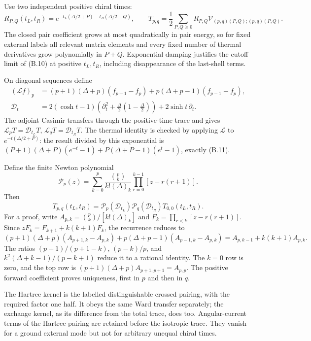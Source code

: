 Use two independent positive chiral times: \[
R_{P,Q}(t_L,t_R)=e^{-t_L(\Delta/2+P)-t_R(\Delta/2+Q)},\qquad
T_{p,q}=\frac12\sum_{P,Q\ge0}R_{P,Q}
\mathcal V_{(p,q)(P,Q);(p,q)(P,Q)} .
\] The closed pair coefficient grows at most quadratically in pair energy, so for fixed external labels all relevant matrix elements and every fixed number of thermal derivatives grow polynomially in \(P+Q\). Exponential damping justifies the cutoff limit of (B.10) at positive \(t_L,t_R\), including disappearance of the last-shell terms.

On diagonal sequences define \[
\begin{aligned}
(\mathscr Lf)_p
&=(p+1)(\Delta+p)(f_{p+1}-f_p)
+p(\Delta+p-1)(f_{p-1}-f_p),\\
\mathscr D_t
&=2(\cosh t-1)
\left(\partial_t^2+\frac\Delta2(1-\frac\Delta2)\right)
+2\sinh t\,\partial_t .
\end{aligned}
\tag{B.11}
\] The adjoint Casimir transfers through the positive-time trace and gives \(\mathscr L_pT=\mathscr D_{t_L}T\), \(\mathscr L_qT=\mathscr D_{t_R}T\). The thermal identity is checked by applying \(\mathscr L\) to \(e^{-t(\Delta/2+P)}\): the result divided by this exponential is \((P+1)(\Delta+P)(e^{-t}-1)+P(\Delta+P-1)(e^t-1)\), exactly (B.11).

Define the finite Newton polynomial \[
\mathcal P_p(z)
=\sum_{k=0}^p
\frac{\binom pk}{k!(\Delta)_k}
\prod_{r=0}^{k-1}[z-r(r+1)] .
\tag{B.12}
\] Then \[
\boxed{
T_{p,q}(t_L,t_R)
=\mathcal P_p(\mathscr D_{t_L})
\mathcal P_q(\mathscr D_{t_R})T_{0,0}(t_L,t_R).
}
\tag{B.13}
\] For a proof, write \(A_{p,k}=\binom pk/[k!(\Delta)_k]\) and \(F_k=\prod_{r<k}[z-r(r+1)]\). Since \(zF_k=F_{k+1}+k(k+1)F_k\), the recurrence reduces to \[
(p+1)(\Delta+p)(A_{p+1,k}-A_{p,k})
+p(\Delta+p-1)(A_{p-1,k}-A_{p,k})
=A_{p,k-1}+k(k+1)A_{p,k}.
\tag{B.14}
\] The ratios \((p+1)/(p+1-k)\), \((p-k)/p\), and \(k^2(\Delta+k-1)/(p-k+1)\) reduce it to a rational identity. The \(k=0\) row is zero, and the top row is \((p+1)(\Delta+p)A_{p+1,p+1}=A_{p,p}\). The positive forward coefficient proves uniqueness, first in \(p\) and then in \(q\).

The Hartree kernel is the labelled distinguishable crossed pairing, with the required factor one half. It obeys the same Ward transfer separately; the exchange kernel, as its difference from the total trace, does too. Angular-current terms of the Hartree pairing are retained before the isotropic trace. They vanish for a ground external mode but not for arbitrary unequal chiral times.

